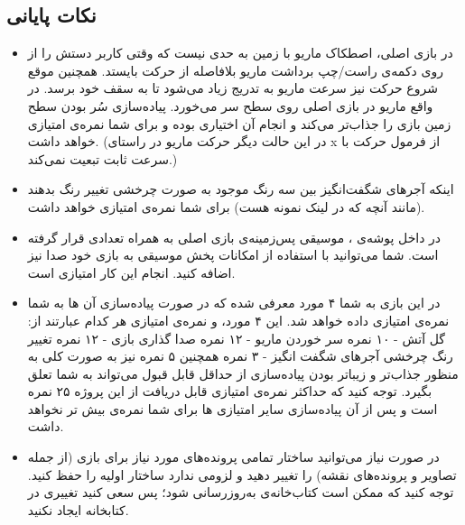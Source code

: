 \documentclass{utap}
\begin{document}
	\subsection{نکات پایانی}
	\begin{itemize}
		\item
در بازی اصلی، اصطکاک ماریو با زمین به حدی نیست که وقتی کاربر دستش را از روی دکمه‌ی راست/چپ برداشت ماریو بلافاصله از حرکت بایستد. همچنین موقع شروع حرکت نیز سرعت ماریو به تدریج زیاد می‌شود تا به سقف خود برسد. در واقع ماریو در بازی اصلی روی سطح سر می‌خورد. پیاده‌سازی سُر بودن سطح زمین بازی را جذاب‌تر می‌کند و انجام آن اختیاری بوده و برای شما نمره‌ی امتیازی خواهد داشت. (در این حالت دیگر حرکت ماریو در راستای x از فرمول حرکت با سرعت ثابت تبعیت نمی‌کند.)
		\item
اینکه آجر‌های شگفت‌انگیز بین سه رنگ موجود به صورت چرخشی تغییر رنگ بدهند (مانند آنچه که در لینک نمونه هست) برای شما نمره‌ی امتیازی خواهد داشت.
	\item
	در داخل پوشه‌ی ، موسیقی پس‌زمینه‌ی بازی اصلی به همراه تعدادی  قرار گرفته است. شما می‌توانید با استفاده از امکانات پخش موسیقی  به بازی خود صدا نیز اضافه کنید. انجام این کار امتیازی است.
	\item
	در این بازی به شما ۴ مورد معرفی شده که در صورت پیاده‌سازی آن ها به شما نمره‌ی امتیازی داده خواهد شد. این ۴ مورد، و نمره‌ی امتیازی هر کدام عبارتند از:
\newline	گل آتش - ۱۰ نمره
\newline	سر خوردن ماریو - ۱۲ نمره
\newline	صدا گذاری بازی - ۱۲ نمره
\newline	تغییر رنگ چرخشی آجر‌های شگفت انگیز - ۳ نمره
\newline همچنین ۵ نمره نیز به صورت کلی به منظور جذاب‌تر و زیباتر بودن پیاده‌سازی از حداقل قابل قبول می‌تواند به شما تعلق بگیرد. توجه کنید که حداکثر نمره‌ی امتیازی قابل دریافت از این پروژه ۲۵ نمره است و پس از آن پیاده‌سازی سایر امتیازی ها برای شما نمره‌ی بیش تر نخواهد داشت.  
		\item
در صورت نیاز می‌توانید ساختار تمامی پرونده‌های مورد نیاز برای بازی (از جمله تصاویر و پرونده‌های نقشه) را تغییر دهید و لزومی ندارد ساختار اولیه را حفظ کنید.
توجه کنید که ممکن است کتاب‌خانه‌ی  به‌روزرسانی شود؛ پس سعی کنید تغییری در کتابخانه ایجاد نکنید.
	
	\end{itemize}
\end{document}
